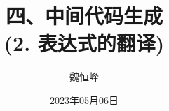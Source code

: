 \documentclass[]{beamer}
\title[语义分析]{四、中间代码生成 \\ (2. 表达式的翻译)}
\author[魏恒峰]{\large 魏恒峰}
\institute{hfwei@nju.edu.cn}
\date{2023年05月06日}
\begin{document}
\maketitle




\thankyou{}

\end{document}

